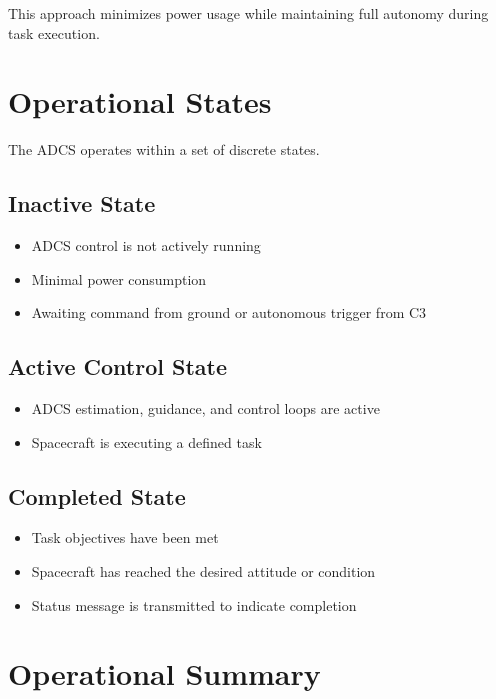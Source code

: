 \documentclass[letterpaper,11pt,oneside,english]{scrreprt}
\begin{document}
	This approach minimizes power usage while maintaining full autonomy during task execution.
	
	\chapter{Operational States}
	
	The ADCS operates within a set of discrete states.
	
	\section{Inactive State}
	
	\begin{itemize}
		\item ADCS control is not actively running
		\item Minimal power consumption
		\item Awaiting command from ground or autonomous trigger from C3
	\end{itemize}
	
	\section{Active Control State}
	
	\begin{itemize}
		\item ADCS estimation, guidance, and control loops are active
		\item Spacecraft is executing a defined task
	\end{itemize}
	
	\section{Completed State}
	
	\begin{itemize}
		\item Task objectives have been met
		\item Spacecraft has reached the desired attitude or condition
		\item Status message is transmitted to indicate completion
	\end{itemize}
	
		
	\chapter{Operational Summary}
	
\end{document}
